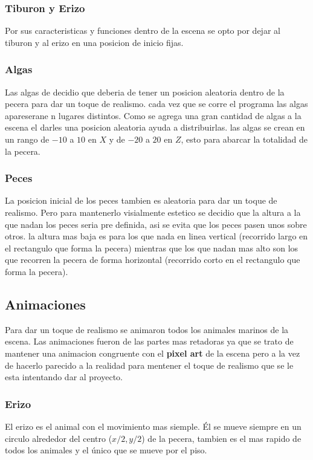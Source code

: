 \documentclass[10pt, a4paper, twocolumn]{article}
\begin{document}
\subsubsection{Tiburon y Erizo}
Por sus caracteristicas y funciones dentro de la escena se opto por dejar al tiburon y al erizo en una posicion de inicio fijas.

\subsubsection{Algas}
Las algas de decidio que deberia de tener un posicion aleatoria dentro de la pecera para dar un toque de realismo. cada vez que se corre el programa las algas apareserane n lugares distintos. Como se agrega una gran cantidad de algas a la escena el darles una posicion aleatoria ayuda a distribuirlas. las algas se crean en un rango de $-10$ a $10$ en $X$ y de $-20$ a $20$ en $Z$, esto para abarcar la totalidad de la pecera.

\subsubsection{Peces}
La posicion inicial de los peces tambien es aleatoria para dar un toque de realismo. Pero para mantenerlo visialmente estetico se decidio que la altura a la que nadan los peces seria pre definida, asi se evita que los peces pasen unos sobre otros. la altura mas baja es para los que nada en linea vertical (recorrido largo en el rectangulo que forma la pecera) mientras que los que nadan mas alto son los que recorren la pecera de forma horizontal (recorrido corto en el rectangulo que forma la pecera).

\subsection{Animaciones}
Para dar un toque de realismo se animaron todos los animales marinos de la escena. Las animaciones fueron de las partes mas retadoras ya que se trato de mantener una animacion congruente con el \textbf{pixel art} de la escena pero a la vez de hacerlo parecido a la realidad para mentener el toque de realismo que se le esta intentando dar al proyecto.

\subsubsection{Erizo}
El erizo es el animal con el movimiento mas siemple. Él se mueve siempre en un circulo alrededor del centro ($x/2,y/2$) de la pecera, tambien es el mas rapido de todos los animales y el único que se mueve por el piso.
\end{document}
